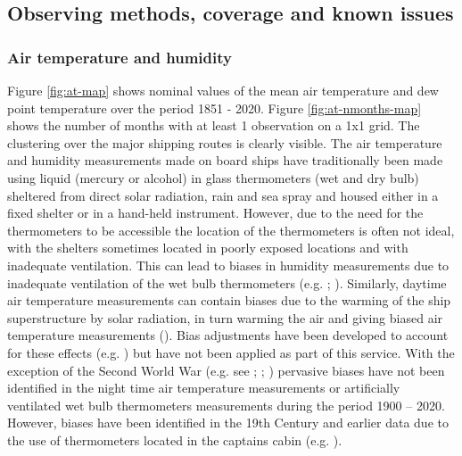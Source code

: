 \FloatBarrier
\subsection{Observing methods, coverage and known issues}
\subsubsection{Air temperature and humidity}
Figure \ref{fig:at-map} shows nominal values of the mean air temperature and dew point temperature over the period 1851 - 2020. 
Figure \ref{fig:at-nmonths-map} shows the number of months with at least 1 observation on a 1x1 grid. 
The clustering over the major shipping routes is clearly visible.
The air temperature and humidity measurements made on board ships have traditionally been made using liquid (mercury or alcohol) in glass thermometers (wet and dry bulb) sheltered from direct solar radiation, rain and sea spray and housed either in a fixed shelter or in a hand-held instrument. 
However, due to the need for the thermometers to be accessible the location of the thermometers is often not ideal, with the shelters sometimes located in poorly exposed locations and with inadequate ventilation.
This can lead to biases in humidity measurements due to inadequate ventilation of the wet bulb thermometers (e.g. \cite{Berry2011}; \cite{Willett2008}). 
Similarly, daytime air temperature measurements can contain biases due to the warming of the ship superstructure by solar radiation, in turn warming the air and giving biased air temperature measurements (\cite{Rayner2003}). 
Bias adjustments have been developed to account for these effects (e.g. \cite{Berry2004}) but have not been applied as part of this service. 
With the exception of the Second World War (e.g. see \cite{Cornes2020}; \cite{Kent2013NMAT}; \cite{Rayner2003}) pervasive biases have not been identified in the night time air temperature measurements or artificially ventilated wet bulb thermometers measurements during the period 1900 – 2020.
However, biases have been identified in the 19th Century and earlier data due to the use of thermometers located in the captains cabin (e.g. \cite{Chenoweth2000}).

